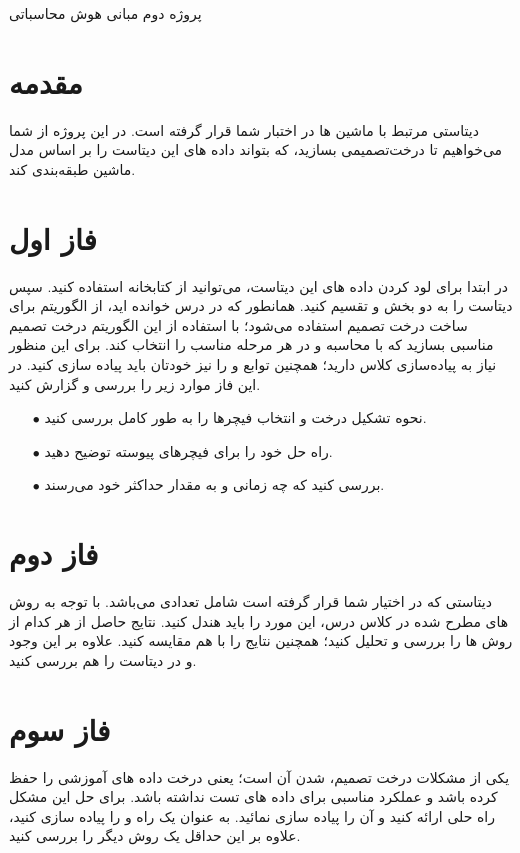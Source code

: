 \documentclass{article}
\begin{document}
	\begin{centering}
		\LARGE
		پروژه دوم مبانی هوش محاسباتی \\
	\end{centering}
	\section*{مقدمه}
	دیتاستی مرتبط با ماشین ها در اختبار شما قرار گرفته است. در این پروژه از شما   می‌خواهیم تا درخت‌تصمیمی بسازید، که بتواند داده های این دیتاست را بر اساس مدل ماشین طبقه‌بندی کند.
	\\

	
	\section{فاز اول}
	در ابتدا برای لود کردن داده های این دیتاست، می‌توانید از کتابخانه  استفاده کنید. سپس دیتاست را به دو بخش  و  تقسیم کنید.
	همانطور که در درس خوانده اید، از الگوریتم  برای ساخت درخت تصمیم استفاده می‌شود؛ با استفاده از این الگوریتم درخت تصمیم مناسبی بسازید که با محاسبه  و  در هر مرحله  مناسب را انتخاب کند. برای این منظور نیاز به پیاده‌سازی کلاس  دارید؛ همچنین توابع   و  را نیز خودتان باید پیاده سازی کنید. در این فاز موارد زیر را بررسی و گزارش کنید.
	\begin{itemize}
		\item [$\bullet$] نحوه تشکیل درخت و انتخاب فیچرها را به طور کامل بررسی کنید.
		\item [$\bullet$] راه حل خود را برای فیچرهای پیوسته توضیح دهید.
		\item [$\bullet$] بررسی کنید که چه زمانی  و  به مقدار حداکثر خود می‌رسند.
	\end{itemize}
	
	\section {فاز دوم}
	دیتاستی که در اختیار شما قرار گرفته است شامل تعدادی  می‌باشد. با توجه به روش های مطرح شده در کلاس درس، این مورد را باید هندل کنید. نتایج حاصل از هر کدام از روش ها را بررسی و تحلیل کنید؛ همچنین نتایج را با هم مقایسه کنید. علاوه بر این وجود  و  در دیتاست را هم بررسی کنید. 
	\section{فاز سوم}
		یکی از مشکلات درخت تصمیم،  شدن آن است؛ یعنی درخت داده های آموزشی را حفظ کرده باشد و عملکرد مناسبی برای داده های تست نداشته باشد. برای حل این مشکل راه حلی ارائه کنید و آن را پیاده سازی نمائید. به عنوان یک راه  و  را پیاده سازی کنید، علاوه بر این حداقل یک روش دیگر را بررسی کنید.
\end{document}
